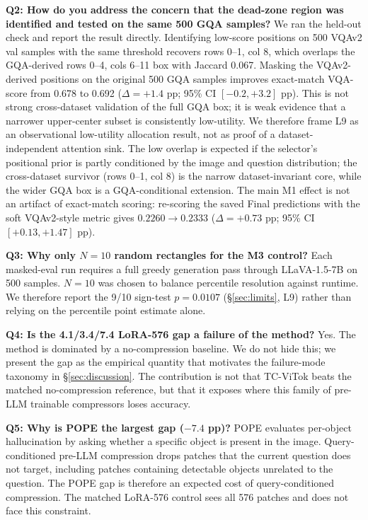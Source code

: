 \documentclass{article}
\begin{document}
\textbf{Q2: How do you address the concern that the dead-zone region was
identified and tested on the same 500 GQA samples?}
We ran the held-out check and report the result directly. Identifying low-score
positions on 500 VQAv2 val samples with the same threshold recovers rows 0--1,
col 8, which overlaps the GQA-derived rows 0--4, cols 6--11 box with Jaccard
0.067. Masking the VQAv2-derived positions on the original 500 GQA samples
improves exact-match VQA-score from 0.678 to 0.692
($\Delta{=}{+}1.4$ pp; 95\% CI $[-0.2,{+3.2}]$ pp). This is not strong
cross-dataset validation of the full GQA box; it is weak evidence that a
narrower upper-center subset is consistently low-utility. We therefore frame
L9 as an observational low-utility allocation result, not as proof of a
dataset-independent attention sink. The low overlap is expected if the
selector's positional prior is partly conditioned by the image and question
distribution; the cross-dataset survivor (rows 0--1, col 8) is the narrow
dataset-invariant core, while the wider GQA box is a GQA-conditional
extension. The main M1 effect is not an artifact of exact-match scoring:
re-scoring the saved Final predictions with the soft VQAv2-style metric gives
$0.2260 \to 0.2333$ ($\Delta{=}{+}0.73$ pp; 95\% CI
$[{+0.13},{+1.47}]$ pp).

\textbf{Q3: Why only $N{=}10$ random rectangles for the M3 control?}
Each masked-eval run requires a full greedy generation pass through
LLaVA-1.5-7B on 500 samples. $N{=}10$ was chosen to balance percentile
resolution against runtime. We therefore report the 9/10 sign-test
$p{=}0.0107$ (\S\ref{sec:limits}, L9) rather than relying on the percentile
point estimate alone.

\textbf{Q4: Is the 4.1/3.4/7.4 LoRA-576 gap a failure of the method?}
Yes. The method is dominated by a no-compression baseline. We do not hide this;
we present the gap as the empirical quantity that motivates the failure-mode
taxonomy in \S\ref{sec:discussion}. The contribution is not that TC-ViTok beats
the matched no-compression reference, but that it exposes where this family of
pre-LLM trainable compressors loses accuracy.

\textbf{Q5: Why is POPE the largest gap ($-7.4$ pp)?}
POPE evaluates per-object hallucination by asking whether a specific object is
present in the image. Query-conditioned pre-LLM compression drops patches that
the current question does not target, including patches containing detectable
objects unrelated to the question. The POPE gap is therefore an expected cost of
query-conditioned compression. The matched LoRA-576 control sees all 576 patches
and does not face this constraint.
\end{document}
